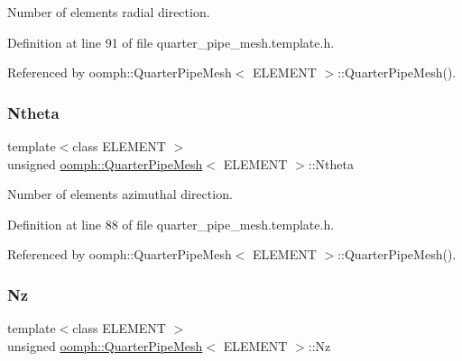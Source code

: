 Number of elements radial direction. 



Definition at line 91 of file quarter\+\_\+pipe\+\_\+mesh.\+template.\+h.



Referenced by oomph\+::\+Quarter\+Pipe\+Mesh$<$ E\+L\+E\+M\+E\+N\+T $>$\+::\+Quarter\+Pipe\+Mesh().

\mbox{\label{classoomph_1_1QuarterPipeMesh_aabe271e163f56d913936d12d2c4d0f21}} 
\subsubsection{\texorpdfstring{Ntheta}{Ntheta}}
{\footnotesize\ttfamily template$<$class E\+L\+E\+M\+E\+NT $>$ \\
unsigned \hyperlink{classoomph_1_1QuarterPipeMesh}{oomph\+::\+Quarter\+Pipe\+Mesh}$<$ E\+L\+E\+M\+E\+NT $>$\+::Ntheta\hspace{0.3cm}{\ttfamily [protected]}}



Number of elements azimuthal direction. 



Definition at line 88 of file quarter\+\_\+pipe\+\_\+mesh.\+template.\+h.



Referenced by oomph\+::\+Quarter\+Pipe\+Mesh$<$ E\+L\+E\+M\+E\+N\+T $>$\+::\+Quarter\+Pipe\+Mesh().

\mbox{\label{classoomph_1_1QuarterPipeMesh_a43bdaa4d81e936615332c5d43e347413}} 
\subsubsection{\texorpdfstring{Nz}{Nz}}
{\footnotesize\ttfamily template$<$class E\+L\+E\+M\+E\+NT $>$ \\
unsigned \hyperlink{classoomph_1_1QuarterPipeMesh}{oomph\+::\+Quarter\+Pipe\+Mesh}$<$ E\+L\+E\+M\+E\+NT $>$\+::Nz\hspace{0.3cm}{\ttfamily [protected]}}



